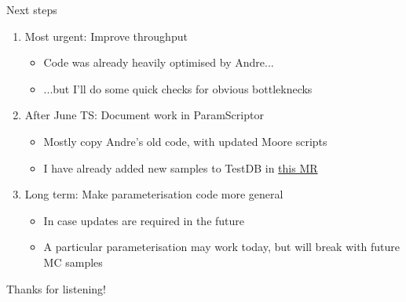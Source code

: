 \documentclass[xcolor={dvipsnames}]{beamer}
\begin{document}
\begin{frame}{Next steps}
  \vspace{0.0cm}
  \begin{enumerate}
    \setlength\itemsep{1.8em}
    \item{Most urgent: Improve throughput}
    \begin{itemize}
      \item{Code was already heavily optimised by Andre...}
      \item{...but I'll do some quick checks for obvious bottleknecks}
    \end{itemize}
    \item{After June TS: Document work in ParamScriptor}
    \begin{itemize}
      \item{Mostly copy Andre's old code, with updated Moore scripts}
      \item{I have already added new samples to TestDB in \href{https://gitlab.cern.ch/lhcb-datapkg/PRConfig/-/merge_requests/567}{this MR}}
    \end{itemize}
    \item{Long term: Make parameterisation code more general}
    \begin{itemize}
      \item{In case updates are required in the future}
      \item{A particular parameterisation may work today, but will break with future MC samples}
    \end{itemize}
  \end{enumerate}
  \begin{center}
    \Huge Thanks for listening!
  \end{center}
\end{frame}
\end{document}
